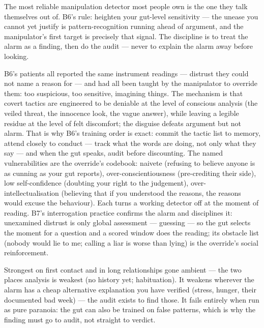 \begin{core}
The most reliable manipulation detector most people own is the one they talk themselves out of. B6's rule: heighten your gut-level sensitivity --- the unease you cannot yet justify is pattern-recognition running ahead of argument, and the manipulator's first target is precisely that signal. The discipline is to treat the alarm as a finding, then do the audit --- never to explain the alarm away before looking.
\end{core}
\begin{mechanism}
B6's patients all reported the same instrument readings --- distrust they could not name a reason for --- and had all been taught by the manipulator to override them: too suspicious, too sensitive, imagining things. The mechanism is that covert tactics are engineered to be deniable at the level of conscious analysis (the veiled threat, the innocence look, the vague answer), while leaving a legible residue at the level of felt discomfort; the disguise defeats argument but not alarm. That is why B6's training order is exact: commit the tactic list to memory, attend closely to conduct --- track what the words are doing, not only what they say --- and when the gut speaks, audit before discounting. The named vulnerabilities are the override's codebook: naivete (refusing to believe anyone is as cunning as your gut reports), over-conscientiousness (pre-crediting their side), low self-confidence (doubting your right to the judgement), over-intellectualisation (believing that if you understood the reasons, the reasons would excuse the behaviour). Each turns a working detector off at the moment of reading.
B7's interrogation practice confirms the alarm and disciplines it: unexamined distrust is only global assessment --- guessing --- so the gut selects the moment for a question and a scored window does the reading; its obstacle list (nobody would lie to me; calling a liar is worse than lying) is the override's social reinforcement.
\end{mechanism}
\begin{conditions}
Strongest on first contact and in long relationships gone ambient --- the two places analysis is weakest (no history yet; habituation). It weakens wherever the alarm has a cheap alternative explanation you have verified (stress, hunger, their documented bad week) --- the audit exists to find those. It fails entirely when run as pure paranoia: the gut can also be trained on false patterns, which is why the finding must go to audit, not straight to verdict.
\end{conditions}
